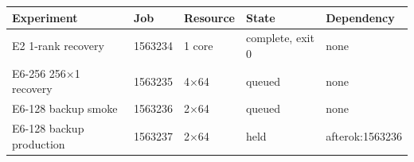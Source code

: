 \begin{tabular}{lllll}
\toprule
Experiment & Job & Resource & State & Dependency\\
\midrule
E2 1-rank recovery & 1563234 & 1 core & complete, exit 0 & none\\
E6-256 256$\times$1 recovery & 1563235 & 4$\times$64 & queued & none\\
E6-128 backup smoke & 1563236 & 2$\times$64 & queued & none\\
E6-128 backup production & 1563237 & 2$\times$64 & held & afterok:1563236\\
\bottomrule
\end{tabular}
